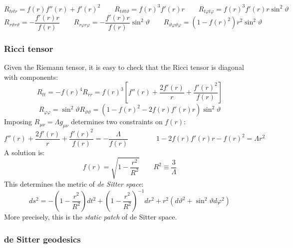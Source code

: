 \begin{equation*}
  R_{trtr} = f(r) f''(r) + f'(r)^2
  \qquad
  R_{t \vartheta t \vartheta} = f(r)^3 f'(r) r
  \qquad
  R_{t \varphi t \varphi} = f(r)^3 f'(r) r \sin^2 \vartheta
\end{equation*}
\begin{equation*}
  R_{r \vartheta r \vartheta} = - \frac{f'(r) r}{f(r)}
  \qquad
  R_{r \varphi r \varphi} = - \frac{f'(r) r}{f(r)} \sin^2 \vartheta
  \qquad
  R_{\vartheta \varphi \vartheta \varphi} = (1 - f(r)^2) r^2 \sin^2 \vartheta
\end{equation*}

\subsubsection{Ricci tensor}

Given the Riemann tensor, it is easy to check that the Ricci tensor is diagonal with components:
\begin{equation*}
  R_{tt} = - f(r)^4 R_{rr} = f(r)^3 \left[ f''(r) + \frac{2f'(r)}{r} + \frac{f'(r)^2}{f(r)} \right]
\end{equation*}
\begin{equation*}
  R_{\varphi \varphi} = \sin^2 \vartheta R_{\vartheta \vartheta} = (1 - f(r)^2 - 2 f(r) f'(r) r) \sin^2 \vartheta
\end{equation*}
Imposing $ R_{\mu \nu} = \Lambda g_{\mu \nu} $ determines two constraints on $ f(r) $:
\begin{equation*}
  f''(r) + \frac{2f'(r)}{r} + \frac{f'(r)^2}{f(r)} = - \frac{\Lambda}{f(r)}
  \qquad \qquad
  1 - 2 f(r) f'(r) r - f(r)^2 = \Lambda r^2
\end{equation*}
A solution is:
\begin{equation*}
  f(r) = \sqrt{1 - \frac{r^2}{R^2}}
  \qquad
  R^2 \equiv \frac{3}{\Lambda}
\end{equation*}
This determines the metric of \textit{de Sitter space}:
\begin{equation}
  ds^2 = - \left( 1 - \frac{r^2}{R^2} \right) dt^2 + \left( 1 - \frac{r^2}{R^2} \right)^{-1} dr^2 + r^2 (d\vartheta^2 + \sin^2 \vartheta d\varphi^2)
  \label{eq:4.14}
\end{equation}
More precisely, this is the \textit{static patch} of de Sitter space.

\subsubsection{de Sitter geodesics}

